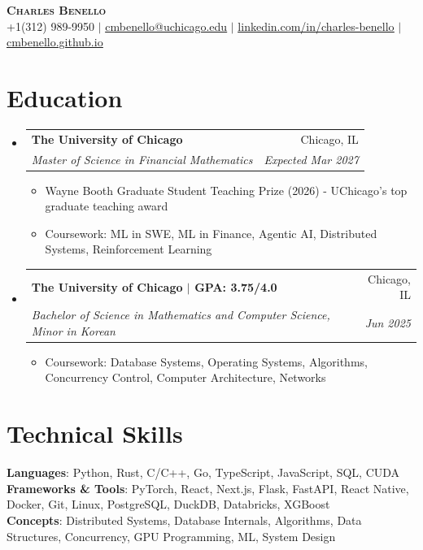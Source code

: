 \documentclass[letterpaper,10pt]{article}
\makeatletter
\newcommand{\resumeItem}[1]{
  \item\small{
    {#1 \vspace{-3pt}}
  }
}
\newcommand{\resumeSubheading}[4]{
  \item
    \begin{tabular*}{0.99\textwidth}[t]{l@{\extracolsep{\fill}}r}
      \textbf{#1} & #2 \\
      \textit{\small#3} & \textit{\small #4} \\
    \end{tabular*}\vspace{-8pt}
}
\newcommand{\resumeSubHeadingListStart}{\begin{itemize}[leftmargin=0.015in, label={}]}
\newcommand{\resumeSubHeadingListEnd}{\end{itemize}}
\newcommand{\resumeItemListStart}{\begin{itemize}[leftmargin=0.15in]}
\newcommand{\resumeItemListEnd}{\end{itemize}\vspace{-7pt}}
\makeatother
\begin{document}
\begin{center}
    \textbf{\Huge \scshape Charles Benello} \\ \vspace{1pt}
    \small +1(312) 989-9950 $|$ \href{mailto:cmbenello@uchicago.edu}{\underline{cmbenello@uchicago.edu}} $|$
    \href{https://linkedin.com/in/charles-benello/}{\underline{linkedin.com/in/charles-benello}} $|$
    \href{https://cmbenello.github.io}{\underline{cmbenello.github.io}}
\end{center}

\section{Education}
  \resumeSubHeadingListStart
    \resumeSubheading
      {The University of Chicago}{Chicago, IL}
      {Master of Science in Financial Mathematics}{Expected Mar 2027}
      \resumeItemListStart
        \resumeItem{Wayne Booth Graduate Student Teaching Prize (2026) - UChicago's top graduate teaching award}
        \resumeItem{Coursework: ML in SWE, ML in Finance, Agentic AI, Distributed Systems, Reinforcement Learning}
      \resumeItemListEnd
    \resumeSubheading
      {The University of Chicago \textbf{$|$ GPA: 3.75/4.0}}{Chicago, IL}
      {Bachelor of Science in Mathematics and Computer Science, Minor in Korean}{Jun 2025}
      \resumeItemListStart
        \resumeItem{Coursework: Database Systems, Operating Systems, Algorithms, Concurrency Control, Computer Architecture, Networks}
      \resumeItemListEnd
  \resumeSubHeadingListEnd

\section{Technical Skills}
 \begin{itemize}[leftmargin=0.015in, label={}]
    \small{\item{
     \textbf{Languages}{: Python, Rust, C/C++, Go, TypeScript, JavaScript, SQL, CUDA} \\
     \textbf{Frameworks \& Tools}{: PyTorch, React, Next.js, Flask, FastAPI, React Native, Docker, Git, Linux, PostgreSQL, DuckDB, Databricks, XGBoost} \\
     \textbf{Concepts}{: Distributed Systems, Database Internals, Algorithms, Data Structures, Concurrency, GPU Programming, ML, System Design}
    }}
 \end{itemize}\vspace{-9pt}
\end{document}
